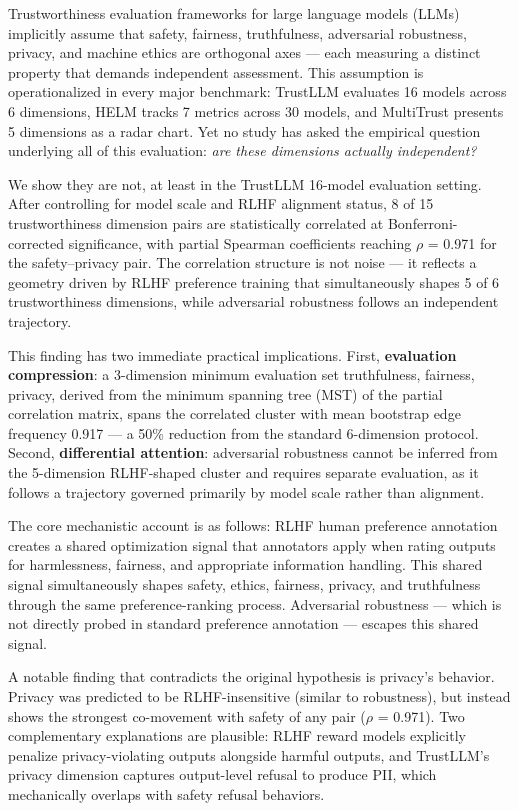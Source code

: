 
Trustworthiness evaluation frameworks for large language models (LLMs) implicitly assume that safety, fairness, truthfulness, adversarial robustness, privacy, and machine ethics are orthogonal axes --- each measuring a distinct property that demands independent assessment. This assumption is operationalized in every major benchmark: TrustLLM \citep{Sun2024TrustLLM} evaluates 16 models across 6 dimensions, HELM \citep{Liang2022} tracks 7 metrics across 30 models, and MultiTrust \citep{Zhang2024MultiTrust} presents 5 dimensions as a radar chart. Yet no study has asked the empirical question underlying all of this evaluation: \textit{are these dimensions actually independent?}

We show they are not, at least in the TrustLLM 16-model evaluation setting. After controlling for model scale and RLHF alignment status, 8 of 15 trustworthiness dimension pairs are statistically correlated at Bonferroni-corrected significance, with partial Spearman coefficients reaching $\rho$ = 0.971 for the safety--privacy pair. The correlation structure is not noise --- it reflects a geometry driven by RLHF preference training that simultaneously shapes 5 of 6 trustworthiness dimensions, while adversarial robustness follows an independent trajectory.

This finding has two immediate practical implications. First, \textbf{evaluation compression}: a 3-dimension minimum evaluation set {truthfulness, fairness, privacy}, derived from the minimum spanning tree (MST) of the partial correlation matrix, spans the correlated cluster with mean bootstrap edge frequency 0.917 --- a 50\% reduction from the standard 6-dimension protocol. Second, \textbf{differential attention}: adversarial robustness cannot be inferred from the 5-dimension RLHF-shaped cluster and requires separate evaluation, as it follows a trajectory governed primarily by model scale rather than alignment.

The core mechanistic account is as follows: RLHF human preference annotation creates a shared optimization signal that annotators apply when rating outputs for harmlessness, fairness, and appropriate information handling. This shared signal simultaneously shapes safety, ethics, fairness, privacy, and truthfulness through the same preference-ranking process. Adversarial robustness --- which is not directly probed in standard preference annotation --- escapes this shared signal.

A notable finding that contradicts the original hypothesis is privacy's behavior. Privacy was predicted to be RLHF-insensitive (similar to robustness), but instead shows the strongest co-movement with safety of any pair ($\rho$ = 0.971). Two complementary explanations are plausible: RLHF reward models explicitly penalize privacy-violating outputs alongside harmful outputs, and TrustLLM's privacy dimension captures output-level refusal to produce PII, which mechanically overlaps with safety refusal behaviors.

